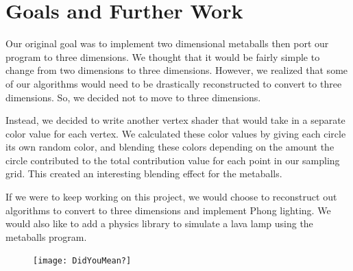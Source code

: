 \documentclass{article}
\begin{document}
\section*{Goals and Further Work}
Our original goal was to implement two dimensional metaballs then port our program to three dimensions. We thought that it would be fairly simple to change from two dimensions to three dimensions. However, we realized that some of our algorithms would need to be drastically reconstructed to convert to three dimensions. So, we decided not to move to three dimensions. 

Instead, we decided to write another vertex shader that would take in a separate color value for each vertex. We calculated these color values by giving each circle its own random color, and blending these colors depending on the amount the circle contributed to the total contribution value for each point in our sampling grid. This created an interesting blending effect for the metaballs. 

If we were to keep working on this project, we would choose to reconstruct out algorithms to convert to three dimensions and implement Phong lighting. We would also like to add a physics library to simulate a lava lamp using the metaballs program. 

\printbibliography

\begin{figure}[h]
\begin{center}
    \texttt{[image: DidYouMean?]}
\end{center}
\end{figure}
\end{document}
